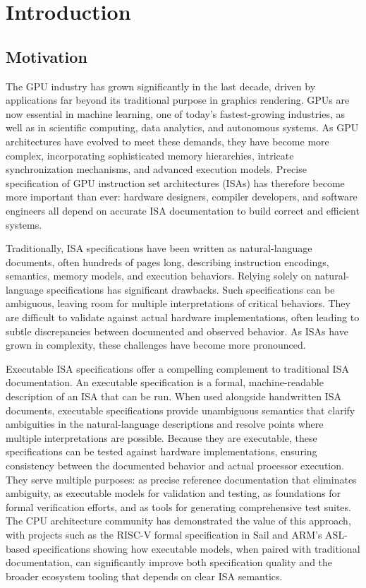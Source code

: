 \chapter{Introduction}
\label{chap:introduction}

\section{Motivation}

The GPU industry has grown significantly in the last decade, driven by
applications far beyond its traditional purpose in graphics rendering.
GPUs are now essential in machine learning, one of today's fastest-growing
industries, as well as in scientific computing, data analytics, and
autonomous systems. As GPU architectures have evolved to meet these
demands, they have become more complex, incorporating sophisticated
memory hierarchies, intricate synchronization mechanisms, and advanced
execution models. Precise specification of GPU instruction set
architectures (ISAs) has therefore become more important than ever:
hardware designers, compiler developers, and software engineers all
depend on accurate ISA documentation to build correct and efficient
systems.

Traditionally, ISA specifications have been written as natural-language
documents, often hundreds of pages long, describing instruction
encodings, semantics, memory models, and execution behaviors. Relying
solely on natural-language specifications has significant drawbacks. Such
specifications can be ambiguous, leaving room for multiple
interpretations of critical behaviors. They are difficult to validate
against actual hardware implementations, often leading to subtle
discrepancies between documented and observed behavior. As ISAs have
grown in complexity, these challenges have become more pronounced.

Executable ISA specifications offer a compelling complement to
traditional ISA documentation. An executable specification is a formal,
machine-readable description of an ISA that can be run. When used
alongside handwritten ISA documents, executable specifications provide
unambiguous semantics that clarify ambiguities in the natural-language
descriptions and resolve points where multiple interpretations are
possible. Because they are executable, these specifications can be
tested against hardware implementations, ensuring
consistency between the documented behavior and actual processor
execution. They serve multiple purposes: as precise reference
documentation that eliminates ambiguity, as executable models for
validation and testing, as foundations for formal verification efforts,
and as tools for generating comprehensive test suites. The CPU
architecture community has demonstrated the value of this approach, with
projects such as the RISC-V formal specification in Sail and ARM's
ASL-based specifications showing how executable models, when paired with
traditional documentation, can significantly improve both specification
quality and the broader ecosystem tooling that depends on clear ISA
semantics.

